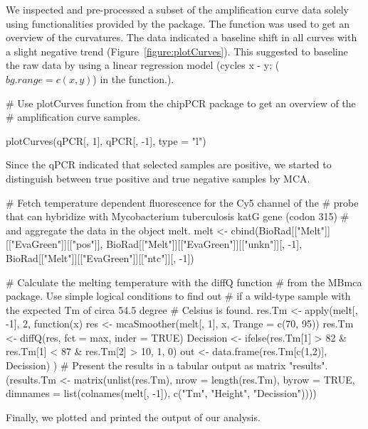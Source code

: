 We inspected and pre-processed a subset of the amplification curve data 
solely using functionalities provided by the  package. The 
 function was used to get an overview of the curvatures. The 
data indicated a baseline shift in all curves with a slight negative trend 
(Figure~\ref{figure:plotCurves}). This suggested to baseline the raw data by 
using a linear regression model (cycles x - y; ($bg.range = c(x, y)$) in the 
 function.).

\begin{example}
# Use plotCurves function from the chipPCR package to get an overview of the
# amplification curve samples.

plotCurves(qPCR[, 1], qPCR[, -1], type = "l")
\end{example}

Since the qPCR indicated that selected samples are positive, we started to 
distinguish between true positive and true negative samples by MCA.
\begin{example}
# Fetch temperature dependent fluorescence for the Cy5 channel of the 
# probe that can hybridize with Mycobacterium tuberculosis katG gene (codon 315)
# and aggregate the data in the object melt.
melt <- cbind(BioRad[["Melt"]][["EvaGreen"]][["pos"]], 
	      BioRad[["Melt"]][["EvaGreen"]][["unkn"]][, -1], 
	      BioRad[["Melt"]][["EvaGreen"]][["ntc"]][, -1])

# Calculate the melting temperature with the diffQ function
# from the MBmca package. Use simple logical conditions to find out
# if a wild-type sample with the expected Tm of circa 54.5 degree 
# Celsius is found.
res.Tm <- apply(melt[, -1], 2, function(x) {
  res <- mcaSmoother(melt[, 1], x, Trange = c(70, 95))
  res.Tm <- diffQ(res, fct = max, inder = TRUE)
  Decission <- ifelse(res.Tm[1] > 82 & res.Tm[1] < 87 & res.Tm[2] > 10, 1, 0)
  out <- data.frame(res.Tm[c(1,2)], Decission)
})     
# Present the results in a tabular output as matrix "results".	      
(results.Tm <- matrix(unlist(res.Tm), nrow = length(res.Tm), byrow = TRUE, 
       dimnames = list(colnames(melt[, -1]),
       c("Tm", "Height", "Decission"))))
\end{example}

Finally, we plotted and printed the output of our analysis.


